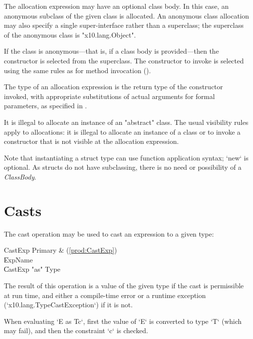 The allocation expression may have an optional class body.
In this case, an anonymous subclass of the given class is
allocated.   An anonymous class allocation may also specify a
single super-interface rather than a superclass; the superclass
of the anonymous class is \xcd"x10.lang.Object".

If the class is anonymous---that is, if a class body is
provided---then the constructor is selected from the superclass.
The constructor to invoke is selected using the same rules as
for method invocation ().

The type of an allocation expression
is the return type of the constructor invoked, with appropriate
substitutions  of actual arguments for formal parameters, as
specified in .

It is illegal to allocate an instance of an \xcd"abstract" class.
The usual visibility rules apply to allocations: 
it is illegal to allocate an instance of a class or to invoke a
constructor that is not visible at
the allocation expression.

Note that instantiating a struct type can use function application syntax; 
\xcd`new` is optional.  As structs do not have subclassing, there is no need or
possibility of a {\em ClassBody}.


\section{Casts}\label{ClassCast}

The cast operation may be used to cast an expression to a given type:

\begin{bbgrammar}
             CastExp \: Primary & (\ref{prod:CastExp}) \\
                    \| ExpName \\
                    \| CastExp \xcd"as" Type \\
\end{bbgrammar}

The result of this operation is a value of the given type if the cast
is permissible at run time, and either a compile-time error or a runtime
exception 
(\xcd`x10.lang.TypeCastException`) if it is not.  

When evaluating \xcd`E as T{c}`, first the value of \xcd`E` is converted to
type \xcd`T` (which may fail), and then the constraint \xcd`{c}` is checked. 



